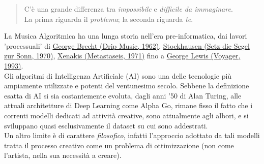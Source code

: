 \documentclass[a4paper,12pt]{report}
\begin{document}
\begin{quote}
\centering
\small
C’è una grande differenza tra \textit{impossibile} e \textit{difficile da immaginare}. \\
La prima riguarda il \textit{problema}; la seconda riguarda \textit{te}.

\end{quote}

La Musica Algoritmica ha una lunga storia nell'era pre-informatica, dai lavori 'processuali' di \href{https://youtu.be/UT5lgaE-qZY}{George Brecht (Drip Music, 1962)}, \href{https://youtu.be/pxs35GrZVAs}{Stockhausen (Setz die Segel zur Sonn, 1970)}, \href{https://youtu.be/SZazYFchLRI}{Xenakis (Metastaseis, 1971)} fino a \href{https://youtu.be/o9UsLbsdA6s}{George Lewis (Voyager, 1993)}. \\

Gli algoritmi di Intelligenza Artificiale (AI) sono una delle tecnologie più ampiamente utilizzate e potenti del ventunesimo secolo. Sebbene la definizione esatta di AI si sia costantemente evoluta, dagli anni '50 di Alan Turing, alle attuali architetture di Deep Learning come Alpha Go, 
rimane fisso il fatto che i correnti modelli dedicati ad attività creative, sono attualmente agli albori, e si sviluppano quasi esclusivamente il dataset su cui sono addestrati. \\
Un altro limite è di carattere \textit{filosofico}, infatti l'approccio adottato da tali modelli tratta il processo creativo come un problema di ottimizzazione (non come l'artista, nella sua necessità a creare). \\ 
\end{document}
